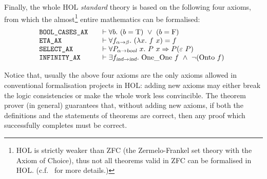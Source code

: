 Finally, the whole HOL \emph{standard} theory is based on the
following four axioms, from which the almost\footnote{HOL is strictly
  weaker than ZFC (the Zermelo-Frankel set theory with the
Axiom of Choice), thus not all theorems valid in ZFC can be formalised
in HOL. (c.f.~\cite{hollogic} for more details.)} entire mathematics
can be formalised:
\begin{equation*}
\begin{array}{@{}l@{\qquad}l}
\mbox{\texttt{BOOL\_CASES\_AX}} &\vdash \uquant{b} (b = \T )\ \vee \ (b = \F )\\
\mbox{\texttt{ETA\_AX}} &
\vdash \uquant{f_{\alpha\fun\beta}}(\lquant{x}f\ x) = f\\
\mbox{\texttt{SELECT\_AX}} &
\vdash \uquant{P_{\alpha\fun\ty{bool}}\ x} P\ x \imp P({\hilbert}\ P)\\
\mbox{\texttt{INFINITY\_AX}}&
\vdash \equant{f_{\ind\fun \ind}} \OneOne \ f \conj \neg(\Onto \ f)\\
\end{array}
\end{equation*}

Notice that, usually the above four axioms are the only axioms allowed
in conventional formalisation projects in HOL: adding new axioms may
either break the logic consistencies or make the whole work less
convincible. The theorem prover (in general) guarantees that,
without adding new axioms, if both the definitions and the statements
of theorems are correct, then any proof which successfully completes must
be correct.

